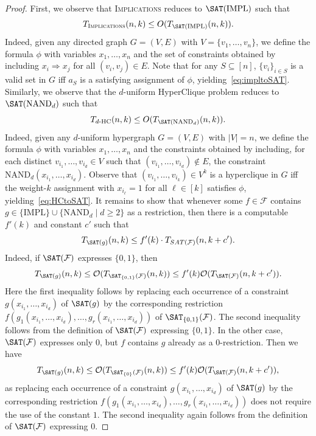 \documentclass[10pt,a4paper]{article}
\theoremstyle{plain}
\newcommand{\Oh}{{\cal O}}
\newcommand{\NAND}{\mathrm{NAND}}
\newcommand{\Impl}{\mathrm{IMPL}}
\newcommand{\confam}{\mathcal{F}}
\newcommand{\Implication}{\textsc{Implications}\xspace}
\newcommand{\THC}[1]{T_{#1\text{-HC}}}
\begin{document}
\begin{proof}
First, we observe that \Implication reduces to $\SAT(\Impl)$ such that 
\begin{equation}\label{eq:impltoSAT}
T_\Implication(n,k)\le O(T_{\SAT(\Impl)}(n,k)).
\end{equation}
Indeed, given any directed graph $G=(V,E)$ with $V=\{v_1,\dots,v_n\}$, we define the formula $\phi$ with variables $x_1,\dots,x_n$ and the set of constraints obtained by including $x_i \Rightarrow x_j$ for all $(v_i,v_j)\in E$. Note that for any $S\subseteq [n]$, $\{v_i\}_{i\in S}$ is a valid set in $G$ iff $a_S$ is a satisfying assignment of $\phi$, yielding~\eqref{eq:impltoSAT}.
%
Similarly, we observe that the $d$-uniform HyperClique problem reduces to $\SAT(\NAND_d)$ such that 
\begin{equation}\label{eq:HCtoSAT}
\THC{d}(n,k)\le O(T_{\SAT(\NAND_d)}(n,k)).
\end{equation}
Indeed, given any $d$-uniform hypergraph $G=(V,E)$ with $|V|= n$, we define the formula $\phi$ with variables $x_1,\dots,x_n$ and the constraints obtained by including, for each distinct $v_{i_1},\dots,v_{i_d}\in V$ such that $(v_{i_1},\dots,v_{i_d}) \notin E$, the constraint $\NAND_d(x_{i_1}, \dots, x_{i_d})$. Observe that $(v_{i_1},\dots,v_{i_k})\in V^k$ is a hyperclique in $G$ iff the weight-$k$ assignment with $x_{i_\ell}=1$ for all $\ell \in [k]$ satisfies $\phi$, yielding~\eqref{eq:HCtoSAT}. 
%
It remains to show that whenever some $f\in \confam$ contains $g \in \{\Impl\} \cup \{\NAND_d \mid d\ge 2\}$ as a restriction, then there is a computable $f'(k)$ and constant $c'$ such that
\begin{equation}\label{eq:restToFam}
T_{\SAT(g)}(n,k) \le f'(k) \cdot T_{SAT(\confam)}(n,k+c').
\end{equation}
Indeed, if $\SAT(\confam)$ expresses $\{0,1\}$, then 
\[ T_{\SAT(g)}(n,k) \le \Oh(T_{\SAT_{\{0,1\}}(\confam)}(n,k)) \le f'(k) \Oh(T_{\SAT(\confam)}(n,k+c')). \]
Here the first inequality follows by replacing each occurrence of a constraint $g(x_{i_1},\dots,x_{i_d})$ of $\SAT(g)$ by the corresponding restriction $f(g_1(x_{i_1},\dots,x_{i_d}),\dots, g_r(x_{i_1},\dots,x_{i_d}))$ of $\SAT_{\{0,1\}}(\confam)$. The second inequality follows from the definition of $\SAT(\confam)$ expressing $\{0,1\}$.
%
In the other case, $\SAT(\confam)$ expresses only $0$, but $f$ contains $g$ already as a $0$-restriction. Then we have
\[ T_{\SAT(g)}(n,k) \le \Oh(T_{\SAT_{\{0\}}(\confam)}(n,k)) \le f'(k) \Oh(T_{\SAT(\confam)}(n,k+c')), \]
as replacing each occurrence of a constraint $g(x_{i_1},\dots,x_{i_d})$ of $\SAT(g)$ by the corresponding restriction $f(g_1(x_{i_1},\dots,x_{i_d}),\dots, g_r(x_{i_1},\dots,x_{i_d}))$ does not require the use of the constant $1$. The second inequality again follows from the definition of $\SAT(\confam)$ expressing $0$.

\end{proof}
\end{document}
